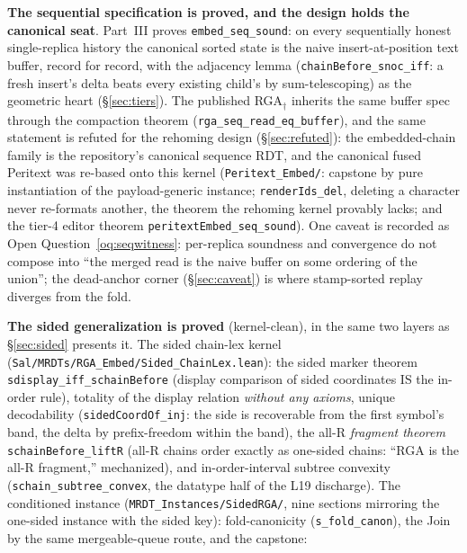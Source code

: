 \documentclass[11pt]{article}
\newcommand{\code}[1]{\texttt{#1}}
\begin{document}
\medskip
\noindent\textbf{The sequential specification is proved, and the
design holds the canonical seat}. Part~III proves
\code{embed\_seq\_sound}: on every sequentially honest
single-replica history the canonical sorted state is the naive
insert-at-position text buffer, record for record, with the adjacency
lemma (\code{chainBefore\_snoc\_iff}: a fresh insert's delta beats
every existing child's by sum-telescoping) as the geometric heart
(\S\ref{sec:tiers}). The published RGA$_\dagger$ inherits the same
buffer spec through the compaction theorem
(\code{rga\_seq\_read\_eq\_buffer}), and the same statement is refuted
for the rehoming design (\S\ref{sec:refuted}): the embedded-chain family
is the repository's canonical
sequence RDT, and the canonical fused Peritext was re-based onto this
kernel (\code{Peritext\_Embed/}: capstone by pure instantiation of the
payload-generic instance; \code{renderIds\_del}, deleting a character
never re-formats another, the theorem the rehoming kernel provably
lacks; and the tier-4 editor theorem
\code{peritextEmbed\_seq\_sound}). One caveat is recorded as Open
Question~\ref{oq:seqwitness}: per-replica soundness and convergence do
not compose into ``the merged read is the naive buffer on some
ordering of the union''; the dead-anchor corner
(\S\ref{sec:caveat}) is where stamp-sorted replay diverges from the
fold.

\medskip
\noindent\textbf{The sided generalization is proved} (kernel-clean), in
the same two layers as \S\ref{sec:sided} presents
it. The sided chain-lex kernel
(\code{Sal/MRDTs/RGA\_Embed/Sided\_ChainLex.lean}): the sided marker
theorem \code{sdisplay\_iff\_schainBefore} (display comparison of
sided coordinates IS the in-order rule), totality of the display
relation \emph{without any axioms}, unique decodability
(\code{sidedCoordOf\_inj}: the side is recoverable from the first
symbol's band, the delta by prefix-freedom within the band), the
all-R \emph{fragment theorem} \code{schainBefore\_liftR} (all-R chains
order exactly as one-sided chains: ``RGA is the all-R fragment,''
mechanized), and in-order-interval subtree convexity
(\code{schain\_subtree\_convex}, the datatype half of the L19
discharge). The conditioned instance
(\code{MRDT\_Instances/SidedRGA/}, nine sections mirroring the
one-sided instance with the sided key): fold-canonicity
(\code{s\_fold\_canon}), the Join by the same mergeable-queue route,
and the capstone:
\end{document}
